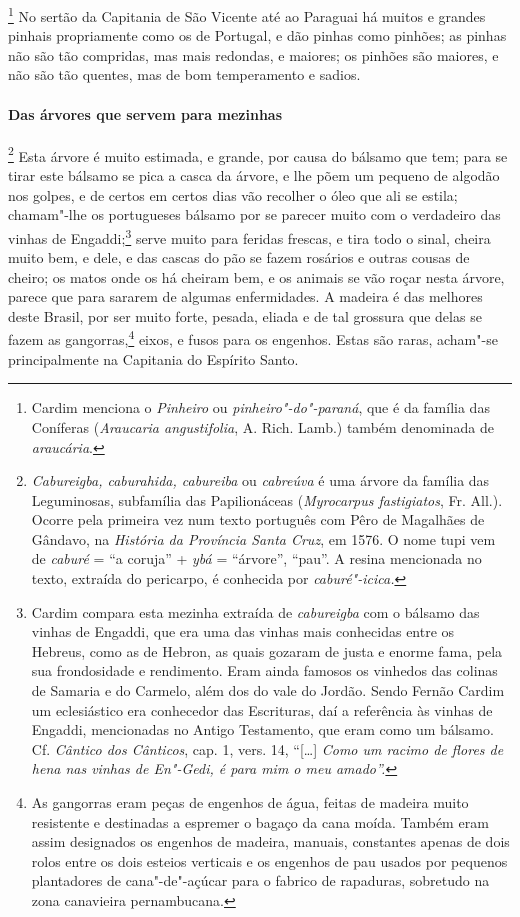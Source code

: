 \begin{linenumbers}
\footnote{ Cardim menciona o \textit{Pinheiro} ou
\textit{pinheiro"-do"-paraná}, que é da família das Coníferas
(\textit{Araucaria angustifolia}, A. Rich. Lamb.) também denominada de
\textit{araucária}.} No sertão da Capitania de São Vicente 
até ao Paraguai há muitos e grandes pinhais propriamente como os de
Portugal, e dão pinhas como pinhões; as pinhas não são tão compridas,
mas mais redondas, e maiores; os pinhões são maiores, e não são tão
quentes, mas de bom temperamento e sadios.

\paragraph{Das árvores que servem para mezinhas}\quad
{}\footnote{ \textit{Cabureigba, caburahida,
cabureiba} ou \textit{cabreúva} é uma árvore da família das
Leguminosas, subfamília das Papilionáceas (\textit{Myrocarpus
fastigiatos}, Fr. All.). Ocorre pela primeira vez num texto português
com Pêro de Magalhães de Gândavo, na \textit{História da Província Santa
Cruz}, em 1576. O nome tupi vem de \textit{caburé} = ``a
coruja'' + \textit{ybá} = ``árvore'', ``pau''. A resina mencionada no texto,
extraída do pericarpo, é conhecida por
\textit{caburé"-icica.}} Esta árvore é muito estimada, e
grande, por causa do bálsamo que tem; para se tirar este bálsamo se
pica a casca da árvore, e lhe põem um pequeno de algodão nos golpes, e
de certos em certos dias vão recolher o óleo que ali se estila;
chamam"-lhe os portugueses bálsamo por se parecer muito com o verdadeiro
das vinhas de Engaddi;\footnote{ Cardim compara esta mezinha extraída
de \textit{cabureigba} com o bálsamo das vinhas de Engaddi, que era uma
das vinhas mais conhecidas entre os Hebreus, como as de Hebron, as
quais gozaram de justa e enorme fama, pela sua frondosidade e
rendimento. Eram ainda famosos os vinhedos das colinas de Samaria e do
Carmelo, além dos do vale do Jordão. Sendo Fernão Cardim um
eclesiástico era conhecedor das Escrituras, daí a referência às vinhas
de Engaddi, mencionadas no Antigo Testamento, que eram como um bálsamo.
Cf. \textit{Cântico dos Cânticos}, cap. 1, vers. 14, ``[\ldots{}] \textit{Como um
racimo de flores de hena nas vinhas de En"-Gedi, é para mim o meu
amado''.}} serve muito para feridas frescas, e tira todo o sinal,
cheira muito bem, e dele, e das cascas do pão se fazem rosários e
outras cousas de cheiro; os matos onde os há cheiram bem, e os animais
se vão roçar nesta árvore, parece que para sararem de algumas
enfermidades. A madeira é das melhores deste Brasil, por ser muito
forte, pesada, eliada e de tal grossura que delas se fazem as 
gangorras,\footnote{ As gangorras eram peças de engenhos de água, feitas de
madeira muito resistente e destinadas a espremer o bagaço da cana
moída. Também eram assim designados os engenhos de madeira, manuais,
constantes apenas de dois rolos entre os dois esteios verticais e os
engenhos de pau usados por pequenos plantadores de cana"-de"-açúcar para
o fabrico de rapaduras, sobretudo na zona canavieira pernambucana.}
eixos, e fusos para os engenhos. Estas são raras, acham"-se
principalmente na Capitania do Espírito Santo.


\end{linenumbers}
